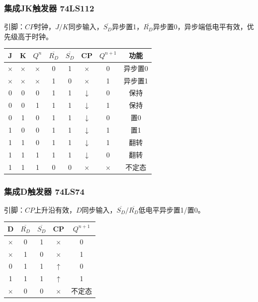 \subsubsection{集成JK触发器 74LS112}
引脚：$CP$时钟，$J/K$同步输入，$\overline{S_D}$异步置1，$\overline{R_D}$异步置0，异步端低电平有效，优先级高于时钟。
\begin{center}
\setlength{\tabcolsep}{2pt}\tiny
\begin{tabular}{cccccc|cc}
\toprule
J & K & $Q^n$ & $\overline{R_D}$ & $\overline{S_D}$ & CP & $Q^{n+1}$ & 功能 \\
\midrule
$\times$ & $\times$ & $\times$ & 0 & 1 & $\times$ & 0 & 异步置0 \\
$\times$ & $\times$ & $\times$ & 1 & 0 & $\times$ & 1 & 异步置1 \\
0 & 0 & 0 & 1 & 1 & $\downarrow$ & 0 & 保持 \\
0 & 0 & 1 & 1 & 1 & $\downarrow$ & 1 & 保持 \\
0 & 1 & 0 & 1 & 1 & $\downarrow$ & 0 & 置0 \\
1 & 0 & 0 & 1 & 1 & $\downarrow$ & 1 & 置1 \\
1 & 1 & 0 & 1 & 1 & $\downarrow$ & 1 & 翻转 \\
1 & 1 & 1 & 1 & 1 & $\downarrow$ & 0 & 翻转 \\
1 & 1 & 1 & 0 & 0 & $\times$ & $\times$ & 不定态 \\
\bottomrule
\end{tabular}
\end{center}

\subsubsection{集成D触发器 74LS74}
引脚：$CP$上升沿有效，$D$同步输入，$\overline{S_D}/\overline{R_D}$低电平异步置1/置0。
\begin{center}
\setlength{\tabcolsep}{3pt}\tiny
\begin{tabular}{cccc|c}
\toprule
D & $\overline{R_D}$ & $\overline{S_D}$ & CP & $Q^{n+1}$ \\
\midrule
$\times$ & 0 & 1 & $\times$ & 0 \\
$\times$ & 1 & 0 & $\times$ & 1 \\
0 & 1 & 1 & $\uparrow$ & 0 \\
1 & 1 & 1 & $\uparrow$ & 1 \\
$\times$ & 0 & 0 & $\times$ & 不定态 \\
\bottomrule
\end{tabular}
\end{center}


